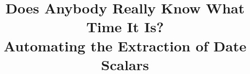 \documentclass{acm_proc_article-sp}
\begin{document}

\title{Does Anybody Really Know What Time It Is?\\
Automating the Extraction of Date Scalars}
%
%
%
%
%
\end{document}
